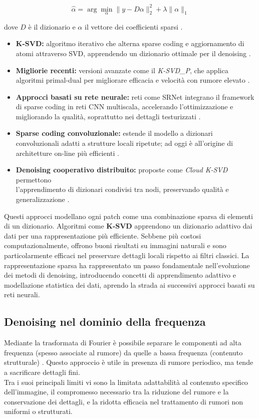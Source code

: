 \documentclass[12pt,a4paper,openright,twoside]{book}
\begin{document}
\[
\hat{\alpha} = \arg\min_{\alpha} \| y - D\alpha \|_2^2 + \lambda \|\alpha\|_1
\]

dove $D$ è il dizionario e $\alpha$ il vettore dei coefficienti sparsi \parencite{FanLinwei2019Broi, wang2020_review}.

\begin{itemize}
    \item \textbf{K-SVD:} algoritmo iterativo che alterna sparse coding e aggiornamento di atomi attraverso SVD, apprendendo un dizionario ottimale per il denoising \parencite{lebrun2012_ksvd, wikipedia_ksvd}.
    \item \textbf{Migliorie recenti:} versioni avanzate come il \emph{K-SVD\_P}, che applica algoritmi primal-dual per migliorare efficacia e velocità con rumore elevato \parencite{xiaok_svdp}.
    \item \textbf{Approcci basati su rete neurale:} reti come SRNet integrano il framework di sparse coding in reti CNN multiscala, accelerando l'ottimizzazione e migliorando la qualità, soprattutto nei dettagli testurizzati \parencite{sheng2022srnet}.
    \item \textbf{Sparse coding convoluzionale:} estende il modello a dizionari convoluzionali adatti a strutture locali ripetute; ad oggi è all'origine di architetture on-line più efficienti \parencite{garcia2018convdict, 2022_accv_cscnet}.
    \item \textbf{Denoising cooperativo distribuito:} proposte come \emph{Cloud K-SVD} permettono \\
    l'apprendimento di dizionari condivisi tra nodi, preservando qualità e generalizzazione \parencite{cloud_ksvd2023}.
\end{itemize}
Questi approcci modellano ogni patch come una combinazione sparsa di elementi di un dizionario. Algoritmi come \textbf{K-SVD} apprendono un dizionario adattivo dai dati per una rappresentazione più efficiente. Sebbene più costosi computazionalmente, offrono buoni risultati su immagini naturali e sono particolarmente efficaci nel preservare dettagli locali rispetto ai filtri classici.
\whiteline
La rappresentazione sparsa ha rappresentato un passo fondamentale nell'evoluzione dei metodi di denoising, introducendo concetti di apprendimento adattivo e modellazione statistica dei dati, aprendo la strada ai successivi approcci basati su reti neurali.

\subsection*{Denoising nel dominio della frequenza}
Mediante la trasformata di Fourier è possibile separare le componenti ad alta frequenza (spesso associate al rumore) da quelle a bassa frequenza (contenuto strutturale) \parencite{oppenheim1999discrete}. 
Questo approccio è utile in presenza di rumore periodico, ma tende a sacrificare dettagli fini.\\
Tra i suoi principali limiti vi sono la limitata adattabilità al contenuto specifico dell'immagine, il compromesso necessario tra la riduzione del rumore e la conservazione dei dettagli, e la ridotta efficacia nel trattamento di rumori non uniformi o strutturati.
\end{document}
